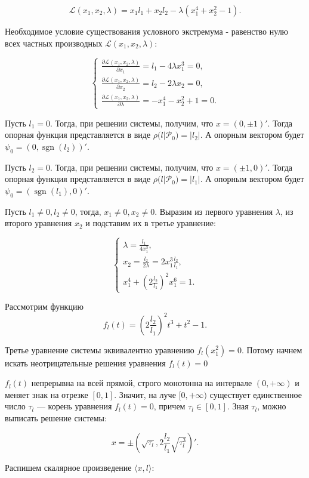 \documentclass{article}
\theoremstyle{definition}
\newcommand{\sgn}{\mathop{\mathrm{sgn}}}
\begin{document}
$$\mathcal{L}(x_1,x_2,\lambda) = x_1l_1+x_2l_2-\lambda(x_1^4+x_2^2-1).$$

Необходимое условие существования условного экстремума - равенство нулю всех
частных производных $\mathcal{L}(x_1,x_2,\lambda)$:

\[
  \begin{cases}
    \frac{\partial \mathcal{L}(x_1,x_2,\lambda)}{\partial x_1} = l_1 - 4\lambda x_1^3 = 0, \\
    \frac{\partial \mathcal{L}(x_1,x_2,\lambda)}{\partial x_2} = l_2 - 2\lambda x_2 = 0, \\
    \frac{\partial \mathcal{L}(x_1,x_2,\lambda)}{\partial \lambda} = -x_1^4-x_2^2+1 = 0.
  \end{cases}
\]

Пусть $l_1 = 0$. Тогда, при решении системы, получим, что $x = (0, \pm 1)'$.
Тогда опорная функция представляется в виде $\rho(l|\mathcal{P}_0) = |l_2|$.
А опорным вектором будет $\psi_0 = (0,\sgn(l_2))'$. 

Пусть $l_2 = 0$. Тогда, при решении системы, получим, что $x = (\pm 1, 0)'$.
Тогда опорная функция представляется в виде $\rho(l|\mathcal{P}_0) = |l_1|$.
А опорным вектором будет $\psi_0 = (\sgn(l_1),0)'$.

Пусть $l_1 \neq 0, l_2 \neq 0$, тогда, $x_1 \neq 0, x_2 \neq 0$. Выразим из первого уравнения 
$\lambda$, из второго уравнения $x_2$ и подставим их в третье уравнение:

\[
  \begin{cases}
    \lambda = \frac{l_1}{4x_1^3}, \\
    x_2 = \frac{l_2}{2\lambda} = 2x_1^3\frac{l_2}{l_1}, \\
    x_1^4 + (2\frac{l_2}{l_1})^2x_1^6 = 1.
  \end{cases}
\]

Рассмотрим функцию $$f_l(t) = (2\frac{l_2}{l_1})^2t^3+t^2-1.$$

Третье уравнение системы эквивалентно уравнению $f_l(x_1^2) = 0$.
Потому начнем искать неотрицательные решения уравнения $f_l(t) = 0$

$f_l(t)$ непрерывна на всей прямой, строго монотонна на
интервале $(0, +\infty)$ и меняет знак на отрезке $[0, 1]$. Значит, на луче $[0, +\infty)$
существует единственное число $\tau_l$ — корень уравнения $f_l(t) = 0$, причем
$\tau_l \in [0, 1]$.
Зная $\tau_l$, можно выписать решение системы:

$$x = \pm (\sqrt{\tau_l}, 2\frac{l_2}{l_1}\sqrt{\tau_l^3})'.$$

Распишем скалярное произведение $\langle x,l \rangle$:
\end{document}
